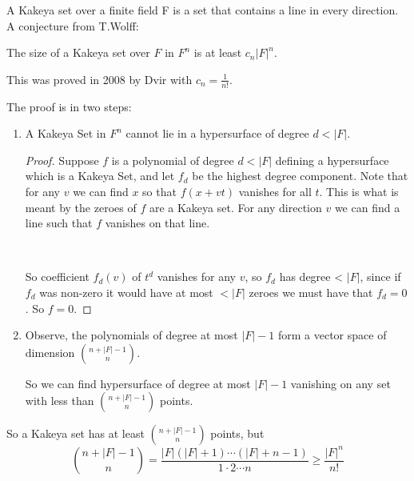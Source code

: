     A Kakeya set over a finite field F is a set that contains a line in every direction. A conjecture from T.Wolff:

    \begin{center}
    The size  of a Kakeya set over $F$ in $F^n$ is at least $c_n|F|^n$.
\end{center}
    
    This was proved in 2008 by Dvir with $c_n = \frac{1}{n!}$.
    
    The proof is in two steps:\begin{enumerate}
        \item  A Kakeya Set in $F^n$ cannot lie in a hypersurface of degree $d<|F|$.
        \begin{proof}
            Suppose $f$ is a polynomial of degree $d<|F|$ defining a hypersurface which is a Kakeya Set, and let $f_d$ be the highest degree component.
            Note that for any $v$ we can find $x$ so that $f(x+vt)$ vanishes for all $t$. This is what is meant by the zeroes of $f$ are a Kakeya set.
            For any direction $v$ we can find a line such that $f$ vanishes on that line.

            \

            So coefficient $f_d(v)$ of $t^d$ vanishes for any $v$, so $f_d$ has degree < $|F|$, since if $f_d$ was non-zero it would have at most $< |F|$ zeroes
            we must have that $f_d = 0$. So $f = 0$.
        \end{proof} 

        \item Observe, the polynomials of degree at most $|F|-1$ form a vector space of dimension $\binom{n+|F|-1}{n}$.

        So we can find hypersurface of degree at most $|F|-1$ vanishing on any set with less than $\binom{n+|F|-1}{n}$ points.
    \end{enumerate}

So a Kakeya set has at least $\binom{n+|F|-1}{n}$ points, but \begin{equation*}
    \binom{n+|F|-1}{n} = \frac{|F|(|F|+1)\cdots (|F|+n-1)}{1\cdot 2 \cdots n} \geq \frac{|F|^n}{n!}
\end{equation*}
    
